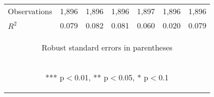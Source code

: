 \begin{center}
\begin{tabular}{lcccccc}
Observations & 1,896 & 1,896 & 1,896 & 1,897 & 1,896 & 1,896 \\
 $R^2$ & 0.079 & 0.082 & 0.081 & 0.060 & 0.020 & 0.079 \\ \hline
\multicolumn{7}{c}{\begin{footnotesize} Robust standard errors in parentheses\end{footnotesize}} \\
\multicolumn{7}{c}{\begin{footnotesize} *** p$<$0.01, ** p$<$0.05, * p$<$0.1\end{footnotesize}} \\
\end{tabular}
\end{center}
